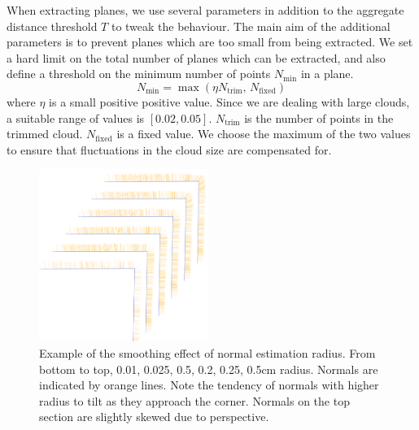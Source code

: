 \documentclass[11pt,a4paper]{kth-mag}
\begin{document}
When extracting planes, we use several parameters in addition to the aggregate
distance threshold $T$ to tweak the behaviour. The main aim of the additional
parameters is to prevent planes which are too small from being extracted. We
set a hard limit on the total number of planes which can be extracted, and also
define a threshold on the minimum number of points $N_{\min}$ in a plane.
\begin{equation}
  \label{eq:7}
  N_{\min}=\max(\eta N_{\text{trim}},\, N_{\text{fixed}})
\end{equation}
where $\eta$ is a small positive positive value. Since we are dealing with large
clouds, a suitable range of values is $\left[0.02,0.05\right]$.
$N_{\text{trim}}$ is the number of points in the trimmed cloud.
$N_{\text{fixed}}$ is a fixed value. We choose the maximum of the two values to
ensure that fluctuations in the cloud size are compensated for.
\newpage
\begin{figure}[H]
  \centering
  \includegraphics[width=0.49\textwidth]{images/normals_comb}
  \caption{Example of the smoothing effect of normal estimation radius. From
    bottom to top, 0.01, 0.025, 0.5, 0.2, 0.25, 0.5cm radius. Normals are
    indicated by orange lines. Note the tendency of normals with higher radius
    to tilt as they approach the corner. Normals on the top section are slightly
    skewed due to perspective.}
  \label{fig:normal_corner}
\end{figure}
\end{document}
